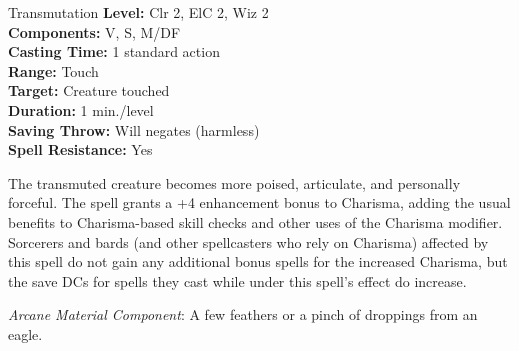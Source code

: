 {Transmutation}
{
	\textbf{Level:}
	Clr 2, ElC 2, Wiz 2\\
	\textbf{Components:}
	V, S, M/DF\\
	\textbf{Casting Time:}
	1 standard action\\
	\textbf{Range:}
	Touch\\
	\textbf{Target:}
	Creature touched\\
	\textbf{Duration:}
	1 min./level\\
	\textbf{Saving Throw:}
	Will negates (harmless)\\
	\textbf{Spell Resistance:}
	Yes\\
}
{
	The transmuted creature becomes more poised, articulate, and personally forceful. The spell grants a +4 enhancement bonus to Charisma, adding the usual benefits to Charisma-based skill checks and other uses of the Charisma modifier. Sorcerers and bards (and other spellcasters who rely on Charisma) affected by this spell do not gain any additional bonus spells for the increased Charisma, but the save DCs for spells they cast while under this spell's effect do increase.

	\textit{Arcane Material Component}:
	A few feathers or a pinch of droppings from an eagle.

}
